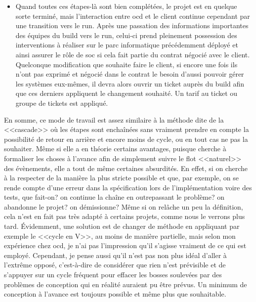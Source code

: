 \documentclass[12pt, oneside, a4paper, titlepage]{report}
\begin{document}
\begin{itemize}
    \item Quand toutes ces étapes-là sont bien complétées, le projet est en
        quelque sorte terminé, mais l'interaction entre \gls{ocd} et le client
        continue cependant par une transition vers le \gls{run}. Après une
        passation des informations importantes des équipes du \gls{build} vers
        le \gls{run}, celui-ci prend pleinement possession des interventions à
        réaliser sur le parc informatique précédemment déployé et ainsi assurer
        le rôle de \gls{soc} si cela fait partie du contrat négocié avec le
        client. Quelconque modification que souhaite faire le client, si encore
        une fois ils n'ont pas exprimé et négocié dans le contrat le besoin
        d'aussi pouvoir gérer les systèmes eux-mêmes, il devra alors ouvrir un
        ticket auprès du \gls{build} afin que ces derniers appliquent le
        changement souhaité. Un tarif au ticket ou groupe de tickets est
        appliqué.

\end{itemize}

En somme, ce mode de travail est assez similaire à la méthode dite de la
<<cascade>> où les étapes sont enchaînées sans vraiment prendre en compte la
possibilité de retour en arrière et encore moins de cycle, ou en tout cas ne pas
la souhaiter. Même si elle a en théorie certains avantages, puisque cherche à
formaliser les choses à l'avance afin de simplement suivre le flot <<naturel>>
des évènements, elle a tout de même certaines absurdités. En effet, si on
cherche à la respecter de la manière la plus stricte possible et que, par
exemple, on se rende compte d'une erreur dans la spécification lors de
l'implémentation voire des tests, que fait-on? on continue la chaîne en
outrepassant le problème? on abandonne le projet? on démissionne? Même si on
relâche un peu la définition, cela n'est en fait pas très adapté à certains
projets, comme nous le verrons plus tard. Évidemment, une solution est de
changer de méthode en appliquant par exemple le <<cycle en V>>, au moins de
manière partielle, mais selon mon expérience chez \gls{ocd}, je n'ai pas
l'impression qu'il s'agisse vraiment de ce qui est employé. Cependant, je pense
aussi qu'il n'est pas non plus idéal d'aller à l'extrême opposé, c'est-à-dire de
considérer que rien n'est prévisible et de s'appuyer sur un cycle fréquent pour
effacer les bosses soulevées par des problèmes de conception qui en réalité
auraient pu être prévus. Un minimum de conception à l'avance est toujours
possible et même plus que souhaitable.
\end{document}
